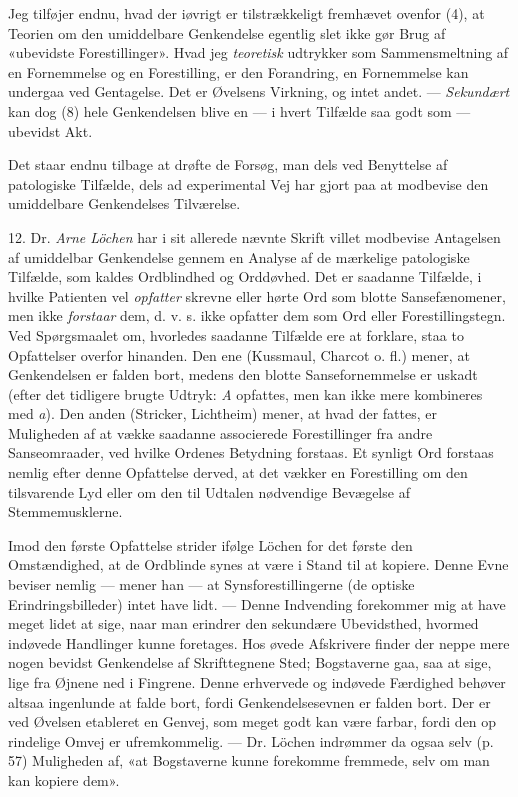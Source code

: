 \documentclass[12pt,a4paper,openany]{book}
\newcommand{\opage}[1]{\marginnote{\footnotesize\textit{[#1]}}}
\begin{document}
Jeg tilføjer endnu, hvad der iøvrigt er tilstrækkeligt fremhævet ovenfor (4),
at Teorien om den umiddelbare Genkendelse egentlig slet ikke gør Brug af
«ubevidste Forestillinger». Hvad jeg \emph{teoretisk} udtrykker som
Sammensmeltning af en Fornemmelse og en Forestilling, er den Forandring, en
Fornemmelse kan undergaa ved Gentagelse. Det er Øvelsens Virkning, og intet
andet. --- \emph{Sekundært} kan dog (8) hele Genkendelsen blive en --- i hvert
Tilfælde saa godt som --- ubevidst Akt.

Det staar endnu tilbage at drøfte de Forsøg, man dels ved Benyttelse af
patologiske Tilfælde, dels ad experimental Vej har gjort paa at modbevise den
umiddelbare Genkendelses Tilværelse.

12. Dr. \emph{Arne Löchen} har i sit allerede nævnte Skrift villet modbevise
Antagelsen af umiddelbar Genkendelse gennem en Analyse af de mærkelige
patologiske Tilfælde, som kaldes Ordblindhed og Orddøvhed. Det er saadanne
Tilfælde, i hvilke Patienten vel \emph{opfatter} skrevne eller hørte Ord som
blotte Sansefænomener, men ikke \emph{forstaar} dem, d. v. s. ikke opfatter dem
som Ord eller Forestillingstegn. Ved Spørgsmaalet om, hvorledes saadanne
Tilfælde ere at forklare, staa to Opfattelser overfor hinanden. Den ene
(Kussmaul, Charcot o. fl.) mener, at Genkendelsen er falden bort, medens den
blotte Sansefornemmelse er uskadt (efter det tidligere brugte Udtryk:
\textit{A} opfattes, men kan ikke mere kombineres med \textit{a}). Den anden
(Stricker, Lichtheim) mener, at hvad der fattes, er Muligheden af at vække
saadanne associerede Forestillinger fra andre Sanseomraader, ved hvilke Ordenes
Betydning forstaas. Et synligt Ord forstaas nemlig efter denne Opfattelse
derved, at det vækker en Forestilling om den tilsvarende Lyd eller om den til
Udtalen nødvendige Bevægelse af Stemmemusklerne.

Imod den første Opfattelse strider ifølge Löchen for det første den
Omstændighed, at de Ordblinde synes at være i Stand til at kopiere. Denne Evne
beviser nemlig --- mener han --- at Synsforestillingerne (de optiske
Erindringsbilleder) intet have lidt. --- Denne Indvending forekommer mig at
have meget lidet at sige, naar man erindrer den sekundære Ubevidsthed, hvormed
indøvede Handlinger kunne foretages. Hos øvede Afskrivere finder der neppe mere
nogen bevidst Genkendelse af Skrifttegnene Sted; Bogstaverne gaa, saa at sige,
lige fra Øjnene ned i Fingrene. Denne erhvervede og indøvede Færdighed behøver
altsaa ingenlunde at falde bort, fordi Genkendelsesevnen er falden bort. Der er
ved Øvelsen etableret en Genvej, som meget godt kan være farbar, fordi den op%
\setcounter{footnote}{0}%
\opage{26}rindelige Omvej er ufremkommelig. --- Dr. Löchen indrømmer da ogsaa
selv (p. 57) Muligheden af, «at Bogstaverne kunne forekomme fremmede, selv om
man kan kopiere dem».
\end{document}
